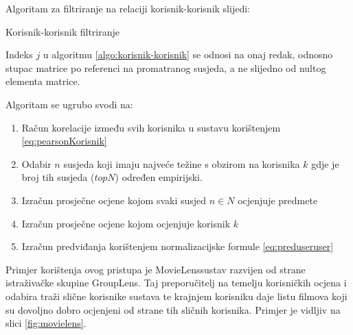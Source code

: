 \documentclass[times, utf8, diplomski, numeric]{fer}
\begin{document}
Algoritam za filtriranje na relaciji korisnik-korisnik slijedi:
\begin{algorithm}[H]
	\caption{Korisnik-korisnik filtriranje}
	\label{algo:korisnik-korisnik}
	\begin{algorithmic}[1]
		
		
		
			\ENDFOR
		\ENDFOR
	\end{algorithmic}
\end{algorithm}
Indeks $j$ u algoritmu \ref{algo:korisnik-korisnik} se odnosi na onaj redak,
odnosno stupac matrice po referenci na promatranog susjeda, a ne slijedno od
nultog elementa matrice.

Algoritam se ugrubo svodi na:
\begin{enumerate}
  \item Račun korelacije između svih korisnika u sustavu korištenjem
  \ref{eq:pearsonKorisnik}
  \item Odabir $n$ susjeda koji imaju najveće težine s obzirom na korisnika $k$
  gdje je broj tih susjeda ($topN$) određen empirijski.
  \item Izračun prosječne ocjene kojom svaki susjed $n \in N$ ocjenjuje predmete
  \item Izračun prosječne ocjene kojom ocjenjuje korisnik $k$
  \item Izračun predviđanja korištenjem normalizacijske formule
  \ref{eq:preduseruser}
\end{enumerate}

Primjer korištenja ovog pristupa je \glqq MovieLens\grqq sustav razvijen od
strane istraživačke skupine \glqq GroupLens\grqq \cite{MovieLens}. Taj
preporučitelj na temelju korisničkih ocjena i odabira traži slične korisnike
sustava te krajnjem korisniku daje listu filmova koji su dovoljno dobro
ocjenjeni od strane tih sličnih korisnika. Primjer je vidljiv na slici
\ref{fig:movielens}.
\end{document}
